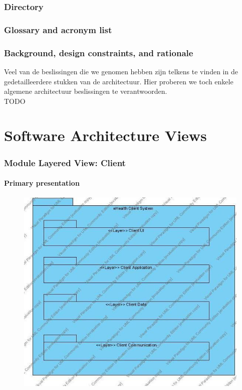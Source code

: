 \documentclass[a4paper,10pt]{article}
\begin{document}
\clearpage
\section{Directory}

\clearpage
\section{Glossary and acronym list}

\clearpage
\section{Background, design constraints, and rationale}
Veel van de beslissingen die we genomen hebben zijn telkens te vinden in de gedetailleerdere stukken van de architectuur.  Hier proberen we toch enkele algemene architectuur beslissingen te verantwoorden.\\
TODO


\part{Software Architecture Views}
\setcounter{section}{0}

\clearpage
\section{Module Layered View: Client}

\subsection{Primary presentation}

\begin{center}
    \begin{figure}[h!]
      \includegraphics[width=\textwidth]{../images/LayeredView_Client.jpg}
    \end{figure}
  \end{center}
\end{document}

